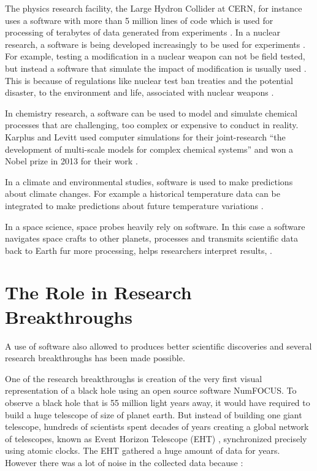 The physics research facility, the Large Hydron Collider at CERN, for instance uses a software with more than 5 million lines of code which is used for processing of terabytes of data generated from experiments \citep{storer2017bridging}.
In a nuclear research, a software is being developed increasingly to be used for experiments \citep{yan2017case}. For example, testing a modification in a nuclear weapon can not be field tested, but instead a software that simulate the impact of modification is usually used \citep{kanewala2014testing}. This is because of regulations like nuclear test ban treaties and the potential disaster, to the environment and life, associated with nuclear weapons \citep{enwiki:1053274189}. 

In chemistry research, a software can be used to model and simulate chemical processes that are challenging, too complex or expensive to conduct in reality. Karplus and Levitt used computer simulations for their joint-research “the development of multi-scale models for complex chemical systems”  and won a Nobel prize in 2013 for their work \citep{storer2017bridging, andre2014nobel}. 

In a climate and environmental studies, software is used to make predictions about climate changes. For example a historical temperature data can be integrated to make predictions about future temperature variations \citep{storer2017bridging}.

In a space science, space probes heavily rely on software. In this case a software navigates space crafts to other planets, processes and transmits scientific data back to Earth fur more processing, helps researchers interpret results, \citep{lutz2011software}. 

%

\section{The Role in Research Breakthroughs  }
\label{sec:background:second_section}
A use of software also allowed to produces better scientific discoveries and several research breakthroughs has been made possible\citep{goble2014better}. 

One of the research breakthroughs is creation of the very first visual representation of a black hole using an open source software NumFOCUS. To observe a black hole that is 55 million light years away, it would have required to build a huge telescope of size of planet earth. But instead of building one giant telescope, hundreds of scientists spent decades of years creating a global network of telescopes, known as Event Horizon Telescope (EHT) \citep{enwiki:1052167868}, synchronized precisely using atomic clocks. The EHT gathered a huge amount of data for years. However there was a lot of noise in the collected data because :


